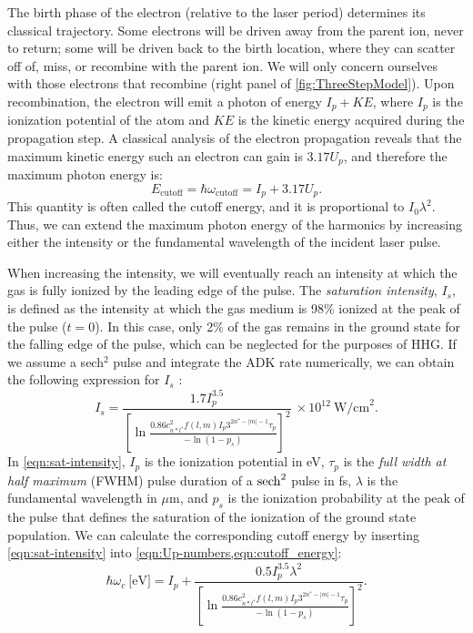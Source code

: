 The birth phase of the electron (relative to the laser period) determines its classical trajectory. Some electrons will be driven away from the parent ion, never to return; some will be driven back to the birth location, where they can scatter off of, miss, or recombine with the parent ion. We will only concern ourselves with those electrons that recombine (right panel of \cref{fig:ThreeStepModel}). Upon recombination, the electron will emit a photon of energy $I_p + KE$, where $I_p$ is the ionization potential of the atom and $KE$ is the kinetic energy acquired during the propagation step. A classical analysis of the electron propagation reveals that the maximum kinetic energy such an electron can gain is $3.17 U_p$, and therefore the maximum photon energy is: 
\begin{equation}
E_{\textrm{cutoff}} = \hbar \omega_{\textrm{cutoff}} = I_p + 3.17 U_p.
\label{eqn:cutoff_energy}
\end{equation}
This quantity is often called the cutoff energy, and it is proportional to $I_0 \lambda^2$. Thus, we can extend the maximum photon energy of the harmonics by increasing either the intensity or the fundamental wavelength of the incident laser pulse.

When increasing the intensity, we will eventually reach an intensity at which the gas is fully ionized by the leading edge of the pulse. The \textit{saturation intensity}, $I_s$, is defined as the intensity at which the gas medium is 98\% ionized at the peak of the pulse ($t=0$). In this case, only 2\% of the gas remains in the ground state for the falling edge of the pulse, which can be neglected for the purposes of HHG. If we assume a sech$^2$ pulse and integrate the ADK rate numerically, we can obtain the following expression for $I_{s}$ \cite{changFundamentalsAttosecondOptics2011}:
\begin{equation}
I_s = \frac{1.7 I_p^{3.5}}{\left[ \ln \frac{0.86 c_{n*l^*}^2 f(l,m) I_p 3^{2n^*-|m|-1} \tau_p}{- \ln(1-p_s)}\right]^2} \ \times 10^{12} \ \textrm{W/cm}^2.
\label{eqn:sat-intensity}
\end{equation}
In \cref{eqn:sat-intensity}, $I_p$ is the ionization potential in eV, $\tau_p$ is the \textit{full width at half maximum} (FWHM) pulse duration of a $\sech^2$ pulse in fs, $\lambda$ is the fundamental wavelength in $\mu$m, and $p_s$ is the ionization probability at the peak of the pulse that defines the saturation of the ionization of the ground state population. We can calculate the corresponding cutoff energy by inserting \cref{eqn:sat-intensity} into \cref{eqn:Up-numbers,eqn:cutoff_energy}:
\begin{equation}
\hbar \omega_c \ \textrm{[eV]} = I_p + \frac{0.5 I_p^{3.5} \lambda^2}{\left[ \ln \frac{0.86 c_{n*l^*}^2 f(l,m) I_p 3^{2n^*-|m|-1} \tau_p}{- \ln(1-p_s)}\right]^2}.
\label{eqn:sat-int-cutoff}
\end{equation}

